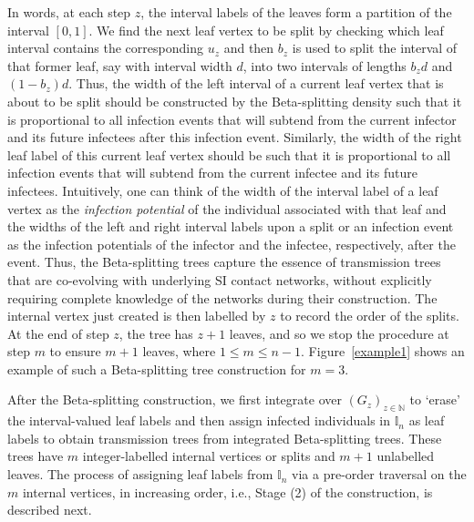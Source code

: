\documentclass[review]{elsarticle}
\numberwithin{equation}{section}
\newcommand{\bI}{{\mathbb I}}
\newcommand{\bN}{{\mathbb N}}
\begin{document}
In words, at each step $z$, the interval labels of the leaves form a partition of the interval $[0,1]$.  
We find the next leaf vertex to be split by checking which leaf interval contains the corresponding $u_z$ and then $b_z$ is used to split the interval of that former leaf, say with interval width $d$, into two intervals of lengths $b_z d$ and $(1-b_z)d$. 
Thus, the width of the left interval of a current leaf vertex that is about to be split should be constructed by the Beta-splitting density such that it is proportional to all infection events that will subtend from the current infector and its future infectees after this infection event.  
Similarly, the width of the right leaf label of this current leaf vertex should be such that it is proportional to all infection events that will subtend from the current infectee and its future infectees.  
Intuitively, one can think of the width of the interval label of a leaf vertex as the {\em infection potential} of the individual associated with that leaf and the widths of the left and right interval labels upon a split or an infection event as the infection potentials of the infector and the infectee, respectively, after the event.  
Thus, the Beta-splitting trees capture the essence of transmission trees that are co-evolving with underlying SI contact networks, without explicitly requiring complete knowledge of the networks during their construction.
The internal vertex just created is then labelled by $z$ to record the order of the splits.  
At the end of step $z$, the tree has $z+1$ leaves, and so we stop the procedure at step $m$ to ensure $m+1$ leaves, where $1 \leq m \leq n-1$.  
Figure~\ref{example1} shows an example of such a Beta-splitting tree construction for $m=3$. 


After the Beta-splitting construction, we first integrate over $(G_z)_{z\in \bN}$ to `erase' the interval-valued leaf labels and then assign infected individuals in $\bI_n$ as leaf labels to obtain transmission trees from integrated Beta-splitting trees. 
These trees have $m$ integer-labelled internal vertices or splits and $m+1$ unlabelled leaves.  
The process of assigning leaf labels from $\bI_n$ via a pre-order traversal on the $m$ internal vertices, in increasing order, i.e., Stage (2) of the construction, is described next.
\end{document}
